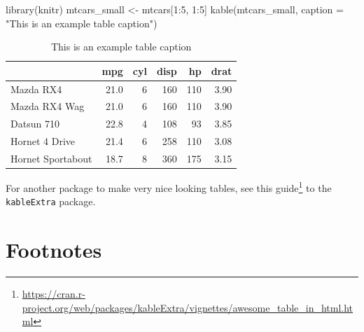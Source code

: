 \documentclass[
]{krantz}
\makeatletter
\newenvironment{Shaded}{\begin{snugshade}}{\end{snugshade}}
\newcommand{\AttributeTok}[1]{\textcolor[rgb]{0.61,0.61,0.61}{#1}}
\newcommand{\DecValTok}[1]{\textcolor[rgb]{0.06,0.06,0.06}{#1}}
\newcommand{\FunctionTok}[1]{\textcolor[rgb]{0,0,0}{#1}}
\newcommand{\NormalTok}[1]{#1}
\newcommand{\OtherTok}[1]{\textcolor[rgb]{0.37,0.37,0.37}{#1}}
\newcommand{\SpecialCharTok}[1]{\textcolor[rgb]{0,0,0}{#1}}
\newcommand{\StringTok}[1]{\textcolor[rgb]{0.5,0.5,0.5}{#1}}
\renewcommand{\href}[2]{#2\footnote{\url{#1}}}
\newenvironment{kframe}{%
\medskip{}
\setlength{\fboxsep}{.8em}
 \def\at@end@of@kframe{}%
 \ifinner\ifhmode%
  \def\at@end@of@kframe{\end{minipage}}%
  \begin{minipage}{\columnwidth}%
 \fi\fi%
 \def\FrameCommand##1{\hskip\@totalleftmargin \hskip-\fboxsep
 \colorbox{shadecolor}{##1}\hskip-\fboxsep
     \hskip-\linewidth \hskip-\@totalleftmargin \hskip\columnwidth}%
 \MakeFramed {\advance\hsize-\width
   \@totalleftmargin\z@ \linewidth\hsize
   \@setminipage}}%
 {\par\unskip\endMakeFramed%
 \at@end@of@kframe}
\renewenvironment{Shaded}{\begin{kframe}}{\end{kframe}}
\makeatother
\begin{document}
\begin{Shaded}
\begin{Highlighting}[]
\FunctionTok{library}\NormalTok{(knitr)}
\NormalTok{mtcars\_small }\OtherTok{\textless{}{-}}\NormalTok{ mtcars[}\DecValTok{1}\SpecialCharTok{:}\DecValTok{5}\NormalTok{, }\DecValTok{1}\SpecialCharTok{:}\DecValTok{5}\NormalTok{]}
\FunctionTok{kable}\NormalTok{(mtcars\_small, }\AttributeTok{caption =} \StringTok{"This is an example table caption"}\NormalTok{)}
\end{Highlighting}
\end{Shaded}

\begin{table}

\caption{\label{tab:unnamed-chunk-2}This is an example table caption}
\centering
\begin{tabular}[t]{l|r|r|r|r|r}
\hline
  & mpg & cyl & disp & hp & drat\\
\hline
Mazda RX4 & 21.0 & 6 & 160 & 110 & 3.90\\
\hline
Mazda RX4 Wag & 21.0 & 6 & 160 & 110 & 3.90\\
\hline
Datsun 710 & 22.8 & 4 & 108 & 93 & 3.85\\
\hline
Hornet 4 Drive & 21.4 & 6 & 258 & 110 & 3.08\\
\hline
Hornet Sportabout & 18.7 & 8 & 360 & 175 & 3.15\\
\hline
\end{tabular}
\end{table}

For another package to make very nice looking tables, see \href{https://cran.r-project.org/web/packages/kableExtra/vignettes/awesome_table_in_html.html}{this guide} to the \texttt{kableExtra} package.

\hypertarget{footnotes}{%
\section{Footnotes}\label{footnotes}}
\end{document}
